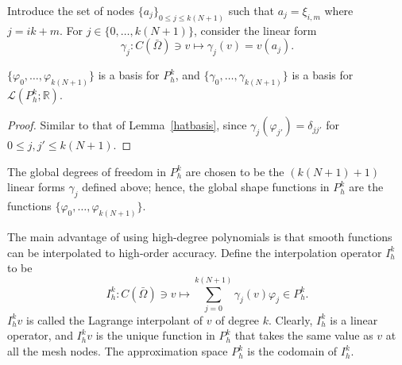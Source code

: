 Introduce the set of nodes $\{a_j\}_{0 \le j \le k(N+1)}$ such that $a_j = \xi_{i,m}$ where $j = ik + m$. For $j \in \{0, \dots, k(N+1)\}$, consider the linear form
\begin{equation*}
\gamma_j: C(\bar{\Omega}) \ni v \mapsto \gamma_j(v) = v(a_j).
\end{equation*}
\begin{lemma}
    $\{\varphi_0, \dots, \varphi_{k(N+1)}\}$ is a basis for $P_h^k$, and $\{\gamma_0, \dots, \gamma_{k(N+1)}\}$ is a basis for $\mathcal{L}(P_h^k; \mathbb{R})$.

\begin{proof}
    Similar to that of Lemma~\ref{hatbasis}, since $\gamma_j(\varphi_{j'}) = \delta_{jj'}$ for $0 \le j,j' \le k(N+1)$.
\end{proof}
\end{lemma}
The global degrees of freedom in $P_h^k$ are chosen to be the $(k(N+1)+1)$ linear forms $\gamma_j$ defined above; hence, the global shape functions in $P_h^k$ are the functions $\{\varphi_0, \dots, \varphi_{k(N+1)}\}$.

The main advantage of using high-degree polynomials is that smooth functions can be interpolated to high-order accuracy. Define the interpolation operator $I_h^k$ to be
\begin{equation*}
I_h^k: C(\bar{\Omega}) \ni v \mapsto \sum_{j=0}^{k(N+1)} \gamma_j(v) \varphi_j \in P_h^k.
\end{equation*}
$I_h^k v$ is called the Lagrange interpolant of $v$ of degree $k$. Clearly, $I_h^k$ is a linear operator, and $I_h^k v$ is the unique function in $P_h^k$ that takes the same value as $v$ at all the mesh nodes. The approximation space $P_h^k$ is the codomain of $I_h^k$. 

